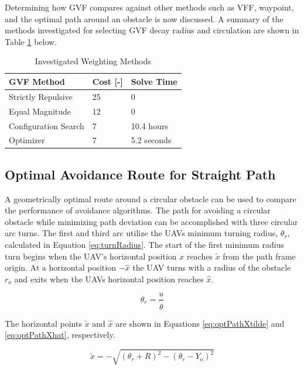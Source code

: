 \documentclass[numbered,pdftex]{ohio-etd}
\begin{document}
Determining how GVF compares against other methods such as VFF, waypoint, and the optimal path around an obstacle is now discussed. A summary of the methods investigated for selecting GVF decay radius and circulation are shown in Table \ref{table:gvfMethodTable} below.




\begin{table}[]
	\centering
	\caption{Investigated Weighting Methods}
	\label{table:gvfMethodTable}
	\begin{tabular}{|l|l|l|}
		\hline
		GVF Method           & Cost {[}-{]} & Solve Time  \\ \hline
		Strictly Repulsive   & 25           & 0           \\ \hline
		Equal Magnitude      & 12           & 0           \\ \hline
		Configuration Search & 7            & 10.4 hours  \\ \hline
		Optimizer            & 7            & 5.2 seconds \\ \hline
	\end{tabular}
\end{table}



\subsection{Optimal Avoidance Route for Straight Path}
A geometrically optimal route around a circular obstacle can be used to compare the performance of avoidance algorithms. The path for avoiding a circular obstacle while minimizing path deviation can be accomplished with three circular arc turns. The first and third arc utilize the UAVs minimum turning radius, $\theta_r$, calculated in Equation \ref{eq:turnRadius}. The start of the first minimum radius turn begins when the UAV's horizontal position $x$ reaches  $\tilde{x}$ from the path frame origin. At a horizontal position $-\hat{x}$ the UAV turns with a radius of the obstacle $r_o$ and exits when the UAVs horizontal position reaches $\hat{x}$. 

\begin{equation}
\label{eq:turnRadius}
\theta_r = \frac{u}{\dot{\theta}}
\end{equation}

\noindent
The horizontal points $\tilde{x}$ and $\hat{x}$ are shown in Equations \ref{eq:optPathXtilde} and \ref{eq:optPathXhat}, respectively. 

\begin{equation}
\label{eq:optPathXtilde}
\widetilde{x} = -\sqrt{(\theta_r+R)^2 - (\theta_r-Y_o)^2}
\end{equation}
\end{document}
